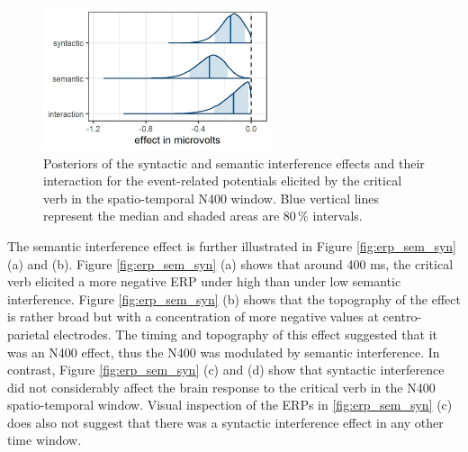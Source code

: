 \documentclass[a4paper, man, floatsintext]{apa7}
\begin{document}
\begin{figure}[H]
    \caption{Posteriors of the syntactic and semantic interference effects and their interaction for the event-related potentials elicited by the critical verb in the spatio-temporal N400 window. Blue vertical lines represent the median and shaded areas are 80\,\% intervals.}
    \label{fig:eeg_posteriors}
    \centering
    \includegraphics[width=0.6\textwidth]{images/posteriors_eeg.jpg}
\end{figure}


The semantic interference effect is further illustrated in Figure \ref{fig:erp_sem_syn} (a) and (b). Figure \ref{fig:erp_sem_syn} (a) shows that around 400 ms, the critical verb elicited a more negative ERP under high than under low semantic interference. Figure \ref{fig:erp_sem_syn} (b) shows that the topography of the effect is rather broad but with a concentration of more negative values at centro-parietal electrodes. The timing and topography of this effect suggested that it was an N400 effect, thus the N400 was modulated by semantic interference. In contrast, Figure \ref{fig:erp_sem_syn} (c) and (d) show that syntactic interference did not considerably affect the brain response to the critical verb in the N400 spatio-temporal window. Visual inspection of the ERPs in \ref{fig:erp_sem_syn} (c) does also not suggest that there was a syntactic interference effect in any other time window.
\end{document}
